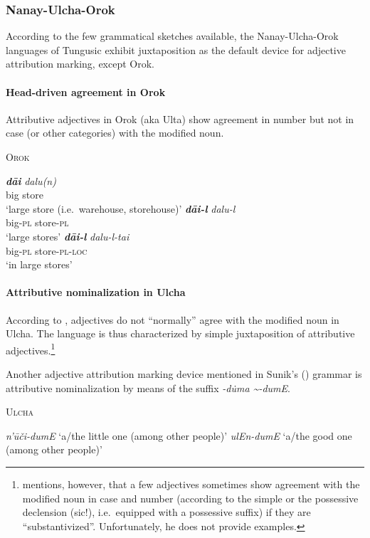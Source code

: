 \subsubsection{Nanay-Ulcha-Orok}
According to the few grammatical sketches available, the Nanay-Ulcha-Orok languages of Tungusic exhibit juxtaposition as the default device for adjective attribution marking, except Orok.

\paragraph{Head-driven agreement in Orok}
Attributive adjectives in Orok (aka Ulta) show agreement in number but not in case (or other categories) with the modified noun.
\begin{exe}
\ex \textsc{Orok} \citep[55]{petrova1967}
\begin{xlist}
\ex
\gll \textit{\textbf{dāi}} \textit{dalu(n)}\\
	big store\\
\glt ‘large store (i.e.~warehouse, storehouse)’
\ex 
\gll	\textit{\textbf{dāi-l}} \textit{dalu-l}\\
	big-\textsc{pl} store-\textsc{pl}\\
\glt	‘large stores’
\ex 
\gll	\textit{\textbf{dāi-l}} \textit{dalu-l-tai}\\
	big-\textsc{pl} store-\textsc{pl}-\textsc{loc}\\
\glt	‘in large stores’
\end{xlist}
\end{exe}

\paragraph{Attributive nominalization in Ulcha}
According to \citet[36, 52–53]{sunik1985}, adjectives do not “normally” agree with the modified noun in Ulcha. The language is thus characterized by simple juxtaposition of attributive adjectives.\footnote{\citet[36]{sunik1985} mentions, however, that a few adjectives sometimes show agreement with the modified noun in case and number (according to the simple or the possessive declension (sic!), i.e.~equipped with a possessive suffix) if they are “substantivized”. Unfortunately, he does not provide examples.}

Another adjective attribution marking device mentioned in Sunik's (\citeyear{sunik1985}) grammar is attributive nominalization by means of the suffix \textit{-d\.uma \textasciitilde-dumE}.
\begin{exe}
\ex \textsc{Ulcha} \citep[38]{sunik1985}
\begin{xlist}
\ex \textit{n'ūči-dumE} ‘a/the little one (among other people)’
\ex \textit{ulEn-dumE} ‘a/the good one (among other people)’
\end{xlist}
\end{exe}


